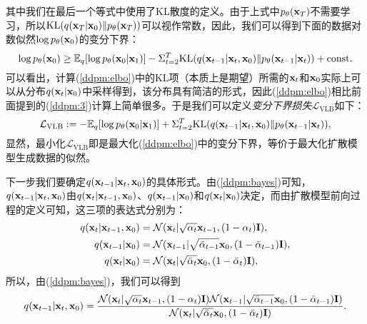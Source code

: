 \documentclass[11pt,a4paper,UTF8]{ctexart}
\begin{document}
其中我们在最后一个等式中使用了KL散度的定义。由于上式中$p_{\theta}(\mathbf{x}_T)$不需要学习，所以$\text{KL}(q(\mathbf{x}_T|\mathbf{x}_0)\| p_{\theta}(\mathbf{x}_T))$可以视作常数，因此，我们可以得到下面的数据对数似然$\log p_{\theta}(\mathbf{x}_0)$的变分下界：
\begin{equation}
\log p_{\theta}(\mathbf{x}_0) \geq \mathbb{E}_q [\log p_{\theta}(\mathbf{x}_0|\mathbf{x}_1)] -  \Sigma_{t=2}^T \text{KL}(q(\mathbf{x}_{t-1}|\mathbf{x}_t,\mathbf{x}_0) \| p_{\theta}(\mathbf{x}_{t-1}|\mathbf{x}_t)) + \text{const}.
\label{ddpm:elbo}
\end{equation}
可以看出，计算(\ref{ddpm:elbo})中的KL项（本质上是期望）所需的$\mathbf{x}_t$和$\mathbf{x}_0$实际上可以从分布$q(\mathbf{x}_t|\mathbf{x}_0)$中采样得到，该分布具有简洁的形式，因此(\ref{ddpm:elbo})相比前面提到的(\ref{ddpm:3})计算上简单很多。于是我们可以定义\emph{变分下界损失}$\mathcal{L}_{\text{VLB}}$如下：
\begin{equation}
\mathcal{L}_{\text{VLB}} := -\mathbb{E}_q [\log p_{\theta}(\mathbf{x}_0|\mathbf{x}_1)] +  \Sigma_{t=2}^T \text{KL}(q(\mathbf{x}_{t-1}|\mathbf{x}_t,\mathbf{x}_0) \| p_{\theta}(\mathbf{x}_{t-1}|\mathbf{x}_t)),
\label{ddpm:loss_vlb}
\end{equation}
显然，最小化$\mathcal{L}_{\text{VLB}}$即是最大化(\ref{ddpm:elbo})中的变分下界，等价于最大化扩散模型生成数据的似然。


下一步我们要确定$q(\mathbf{x}_{t-1}|\mathbf{x}_t,\mathbf{x}_0)$的具体形式。由(\ref{ddpm:bayes})可知，$q(\mathbf{x}_{t-1}|\mathbf{x}_t,\mathbf{x}_0)$由$q(\mathbf{x}_{t}|\mathbf{x}_{t-1},\mathbf{x}_0)$、$q(\mathbf{x}_{t-1}|\mathbf{x}_0)$和$q(\mathbf{x}_{t}|\mathbf{x}_0)$决定，而由扩散模型前向过程的定义可知，这三项的表达式分别为：
\begin{align*}
    q(\mathbf{x}_{t}|\mathbf{x}_{t-1},\mathbf{x}_0) &= \mathcal{N}(\mathbf{x}_t|\sqrt{\alpha_t}\mathbf{x}_{t-1},(1-\alpha_t)\mathbf{I}),  \\
    q(\mathbf{x}_{t-1}|\mathbf{x}_0) &= \mathcal{N}(\mathbf{x}_{t-1}|\sqrt{\bar{\alpha}_{t-1}}\mathbf{x}_0,(1-\bar{\alpha}_{t-1})\mathbf{I}), \\
    q(\mathbf{x}_{t}|\mathbf{x}_0) &=\mathcal{N}(\mathbf{x}_{t}|\sqrt{\bar{\alpha}_{t}}\mathbf{x}_0,(1-\bar{\alpha}_{t})\mathbf{I}),
\end{align*}
所以，由(\ref{ddpm:bayes})，我们可以得到
\begin{equation}
    q(\mathbf{x}_{t-1}|\mathbf{x}_t,\mathbf{x}_0) = \frac{\mathcal{N}(\mathbf{x}_t|\sqrt{\alpha_t}\mathbf{x}_{t-1},(1-\alpha_t)\mathbf{I})\mathcal{N}(\mathbf{x}_{t-1}|\sqrt{\bar{\alpha}_{t-1}}\mathbf{x}_0,(1-\bar{\alpha}_{t-1})\mathbf{I})}{\mathcal{N}(\mathbf{x}_{t}|\sqrt{\bar{\alpha}_{t}}\mathbf{x}_0,(1-\bar{\alpha}_{t})\mathbf{I})}.
\label{ddpm:dist_of_reverse_pre}
\end{equation}
\end{document}
